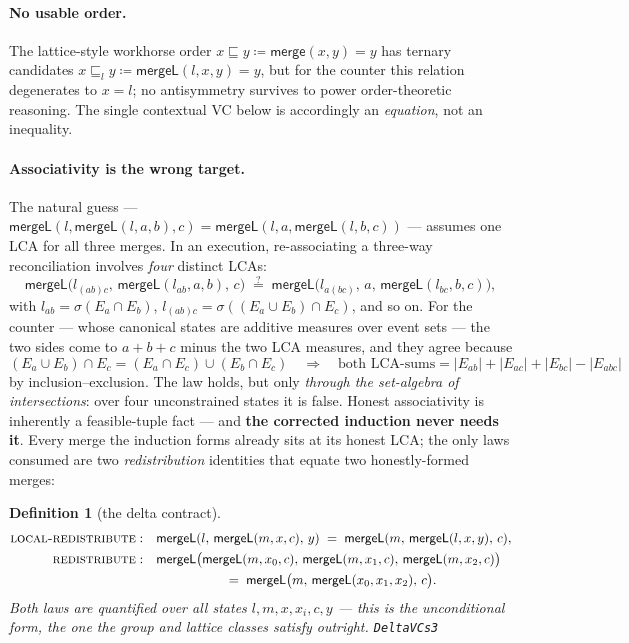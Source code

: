 \documentclass[11pt]{article}
\newtheorem{definition}[theorem]{Definition}
\newcommand{\Merge}{\mathsf{merge}}
\newcommand{\mergeL}{\mathsf{mergeL}}
\newcommand{\lean}[1]{\texttt{#1}}
\begin{document}
\paragraph{No usable order.} The lattice-style workhorse order
$x \sqsubseteq y \coloneqq \Merge(x,y) = y$ has ternary candidates
$x \sqsubseteq_l y \coloneqq \mergeL(l,x,y) = y$, but for the counter this
relation degenerates to $x = l$; no antisymmetry survives to power
order-theoretic reasoning. The single
contextual VC below is accordingly an \emph{equation}, not an inequality.

\paragraph{Associativity is the wrong target.} The natural guess ---
$\mergeL(l,\mergeL(l,a,b),c) = \mergeL(l,a,\mergeL(l,b,c))$ --- assumes
one LCA for all three merges. In an execution, re-associating a three-way
reconciliation involves \emph{four} distinct LCAs:
\[
  \mergeL\bigl(l_{(ab)c},\, \mergeL(l_{ab}, a, b),\, c\bigr)
  \;\overset{?}{=}\;
  \mergeL\bigl(l_{a(bc)},\, a,\, \mergeL(l_{bc}, b, c)\bigr),
\]
with $l_{ab} = \sigma(E_a \cap E_b)$, $l_{(ab)c} = \sigma((E_a \cup E_b)
\cap E_c)$, and so on. For the counter --- whose canonical states are
additive measures over event sets --- the two sides come to $a+b+c$ minus
the two LCA measures, and they agree because
\[
  (E_a \cup E_b) \cap E_c = (E_a \cap E_c) \cup (E_b \cap E_c)
  \quad\Longrightarrow\quad
  \text{both LCA-sums} = |E_{ab}| + |E_{ac}| + |E_{bc}| - |E_{abc}|
\]
by inclusion--exclusion. The law holds, but only \emph{through the
set-algebra of intersections}: over four unconstrained states it is false.
Honest associativity is inherently a feasible-tuple fact --- and \textbf{the corrected induction never
needs it}. Every merge the induction forms already sits at its honest LCA;
the only laws consumed are two \emph{redistribution} identities that
equate two honestly-formed merges:

\begin{definition}[the delta contract]
\label{def:delta}
\begin{align*}
\textsc{local-redistribute}:&\quad
  \mergeL(l,\, \mergeL(m, x, c),\, y) \;=\; \mergeL(m,\, \mergeL(l, x,
  y),\, c),\\
\textsc{redistribute}:&\quad
  \mergeL\bigl(\mergeL(m,x_0,c),\, \mergeL(m,x_1,c),\, \mergeL(m,x_2,c)\bigr)\\
  &\qquad\qquad\qquad\;=\; \mergeL\bigl(m,\, \mergeL(x_0,x_1,x_2),\, c\bigr).
\end{align*}
Both laws are quantified over \emph{all} states $l, m, x, x_i, c, y$ ---
this is the unconditional form, the one the group and lattice classes
satisfy outright.
\hfill\lean{DeltaVCs3}
\end{definition}
\end{document}
